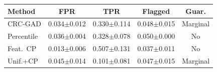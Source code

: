 \begin{tabular}{@{}lcccc@{}}
\toprule
Method & FPR & TPR & Flagged & Guar. \\
\midrule
CRC-GAD & 0.034$\pm$0.012 & 0.330$\pm$0.114 & 0.048$\pm$0.015 & Marginal \\
Percentile & 0.036$\pm$0.004 & 0.328$\pm$0.078 & 0.050$\pm$0.000 & No \\
Feat.\ CP & 0.013$\pm$0.006 & 0.507$\pm$0.131 & 0.037$\pm$0.011 & No \\
Unif.+CP & 0.045$\pm$0.014 & 0.101$\pm$0.081 & 0.047$\pm$0.015 & Marginal \\
\bottomrule
\end{tabular}
